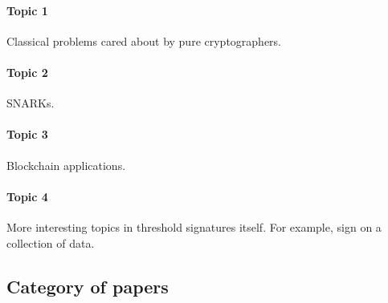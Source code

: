 
\paragraph{Topic 1} Classical problems cared about by pure cryptographers. 
\paragraph{Topic 2} SNARKs. 
\paragraph{Topic 3} Blockchain applications.  
\paragraph{Topic 4} More interesting topics in threshold signatures itself. 
For example, sign on a collection of data. 


\subsection{Category of papers}


